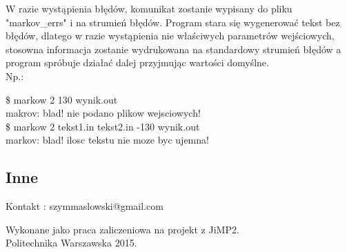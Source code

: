 \documentclass{article}
\begin{document}
W razie wystąpienia błędów, komunikat zostanie wypisany do pliku "markov\_errs" i na strumień błędów. Program stara się wygenerować tekst bez błędów, dlatego w razie wystąpienia nie właściwych parametrów wejściowych, stosowna informacja zostanie wydrukowana na standardowy strumień błędów a program spróbuje działać dalej przyjmując wartości domyślne.\\
Np.:

\$ markow 2 130 wynik.out\\
makrov:  blad! nie podano plikow wejsciowych!\\

\$ markow 2 tekst1.in tekst2.in -130 wynik.out\\
markov: blad! ilosc tekstu nie moze byc ujemna!\\

\subsection*{Inne}
Kontakt : szymmaslowski@gmail.com\\
\begin{center}
Wykonane jako praca zaliczeniowa na projekt z JiMP2.\\Politechnika Warszawska 2015.
\end{center}
\end{document}
